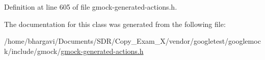 Definition at line 605 of file gmock-\/generated-\/actions.\+h.



The documentation for this class was generated from the following file\+:\begin{DoxyCompactItemize}
\item 
/home/bhargavi/\+Documents/\+S\+D\+R/\+Copy\+\_\+\+Exam\+\_\+X/vendor/googletest/googlemock/include/gmock/\hyperlink{gmock-generated-actions_8h}{gmock-\/generated-\/actions.\+h}\end{DoxyCompactItemize}
